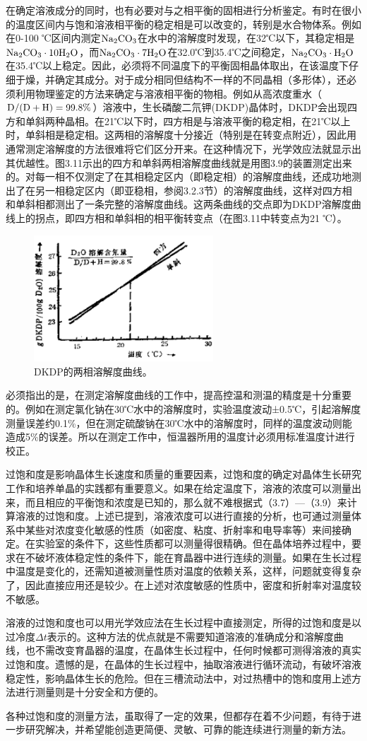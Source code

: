 在确定溶液成分的同时，也有必要对与之相平衡的固相进行分析鉴定。有时在很小的温度区间内与饱和溶液相平衡的稳定相是可以改变的，转别是水合物体系。例如在0-100 ℃区间内测定$\rm Na_2CO_3$在水中的溶解度时发现，在32℃以下，其稳定相是$\rm Na_2CO_3\cdot 10H_2O$，而$\rm Na_2CO_3\cdot 7H_2O$在32.0℃到35.4℃之间稳定，$\rm Na_2CO_3\cdot H_2O$在35.4℃以上稳定。因此，必须将不同温度下的平衡固相晶体取出，在该温度下仔细于燥，并确定其成分。对于成分相同但结构不一样的不同晶相（多形体），还必须利用物理鉴定的方法来确定与溶液相平衡的物相。例如从高浓度重水（$\rm D/(D+H)=99.8\%$）溶液中，生长磷酸二氘钾(DKDP)晶体时，DKDP会出现四方和单斜两种晶相。在21℃以下时，四方相是与溶液平衡的稳定相，在21℃以上时，单斜相是稳定相。这两相的溶解度十分接近（特别是在转变点附近），因此用通常测定溶解度的方法很难将它们区分开来。在这种情况下，光学效应法就显示出其优越性。图3.11示出的四方和单斜两相溶解度曲线就是用图3.9的装置测定出来的。对每一相不仅测定了在其相稳定区内（即稳定相）的溶解度曲线，还成功地测出了在另一相稳定区内（即亚稳相，参阅3.2.3节）的溶解度曲线，这样对四方相和单斜相都测出了一条完整的溶解度曲线。这两条曲线的交点即为DKDP溶解度曲线上的拐点，即四方相和单斜相的相平衡转变点（在图3.11中转变点为21 ℃）。
\begin{figure}[htb]
 \centering
 \includegraphics[width=0.6\textwidth]{fig/cp03/img3.11.jpg}
 \caption{DKDP的两相溶解度曲线。}
\end{figure}
必须指出的是，在测定溶解度曲线的工作中，提高控温和测温的精度是十分重要的。例如在测定氯化钠在30℃水中的溶解度时，实验温度波动±0.5℃，引起溶解度测量误差约0.1\%，但在测定硫酸钠在30℃水中的溶解度时，同样的温度波动则能造成5\%的误差。所以在测定工作中，恒温器所用的温度计必须用标准温度计进行校正。

过饱和度是影响晶体生长速度和质量的重要因素，过饱和度的确定对晶体生长研究工作和培养单晶的实践都有重要意义。如果在给定温度下，溶液的浓度可以测量出来，而且相应的平衡饱和浓度是已知的，那么就不难根据式（3.7）---（3.9）来计算溶液的过饱和度。上述已提到，溶液浓度可以进行直接的分析，也可通过测量体系中某些对浓度变化敏感的性质（如密度、粘度、折射率和电导率等）来间接确定。在实验室的条件下，这些性质都可以测量得很精确。但在晶体培养过程中，要求在不破坏液体稳定性的条件下，能在育晶器中进行连续的测量。如果在生长过程中温度是变化的，还需知道被测量性质对温度的依赖关系，这样，问题就变得复杂了，因此直接应用还是较少。在上述对浓度敏感的性质中，密度和折射率对温度较不敏感。

溶液的过饱和度也可以用光学效应法在生长过程中直接测定，所得的过饱和度是以过冷度$\Delta t$表示的。这种方法的优点就是不需要知道溶液的准确成分和溶解度曲线，也不需改变育晶器的温度，在晶体生长过程中，任何时候都可测得溶液的真实过饱和度。遗憾的是，在晶体的生长过程中，抽取溶液进行循环流动，有破坏溶液稳定性，影响晶体生长的危险。但在三槽流动法中，对过热槽中的饱和度用上述方法进行测量则是十分安全和方便的。

各种过饱和度的测量方法，虽取得了一定的效果，但都存在着不少问题，有待于进一步研究解决，并希望能创造更简便、灵敏、可靠的能连续进行测量的新方法。
